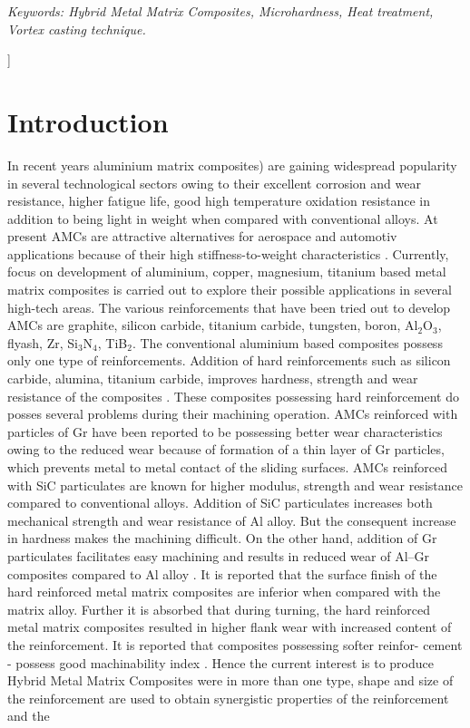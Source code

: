 \documentclass[10pt,a4paper]{article}
\numberwithin{figure}{section}
\numberwithin{table}{section}
\begin{document}
\begin{@twocolumnfalse}
\vspace{0.3cm}
\footnotesize
\noindent
\textit{Keywords: Hybrid Metal Matrix Composites, Microhardness, Heat treatment, Vortex casting technique.}

\vspace{0.5cm}

\hline

\vspace{0.6cm}

\end{@twocolumnfalse}
]
\section{Introduction}

\justify
\large
In recent years aluminium matrix composites) are gaining widespread popularity in several technological sectors owing to their excellent  corrosion and wear resistance, higher fatigue life, good high temperature oxidation resistance in addition to being light in weight when compared with conventional alloys. At present AMCs are attractive alternatives for aerospace and automotiv  applications because of their high stiffness-to-weight characteristics   \cite{rar1}  . Currently, focus on development of aluminium, copper, magnesium, titanium based metal matrix composites is carried out to explore their possible applications in several high-tech areas. The various reinforcements that have been tried out to develop AMCs are graphite, silicon carbide, titanium carbide, tungsten, boron, Al$_2$O$_3$, flyash, Zr, Si$_3$N$_4$, TiB$_2$. The conventional aluminium based composites possess only one type of reinforcements. Addition of  hard reinforcements such as silicon carbide, alumina, titanium carbide, improves hardness, strength and wear resistance of the composites \cite{rar4}.  These composites possessing hard reinforcement do posses several problems during their machining operation. AMCs reinforced with particles of Gr have been reported to be possessing better wear characteristics owing to the reduced wear because of formation of a thin layer of Gr particles, which prevents metal to metal contact of the sliding surfaces. AMCs reinforced with SiC particulates are known for higher modulus, strength and wear resistance compared to conventional alloys. Addition of SiC particulates increases both mechanical strength and wear resistance of Al alloy. But the consequent increase in hardness makes the machining difficult. On the other hand, addition of Gr particulates facilitates easy machining and results in reduced wear of Al–Gr composites compared to Al alloy \cite{rar1}. It is reported that the surface finish of the hard reinforced metal matrix composites are inferior when compared with the matrix alloy. Further it is absorbed that during turning, the hard reinforced metal matrix composites resulted in higher flank wear with increased content of the reinforcement. It is reported that composites possessing softer reinfor- cement - possess good machinability index \cite{rar10}.  Hence the current interest is to produce Hybrid Metal Matrix Composites were in more than one type, shape and size of the reinforcement are used to obtain synergistic properties of the reinforcement and the 
\end{document}
